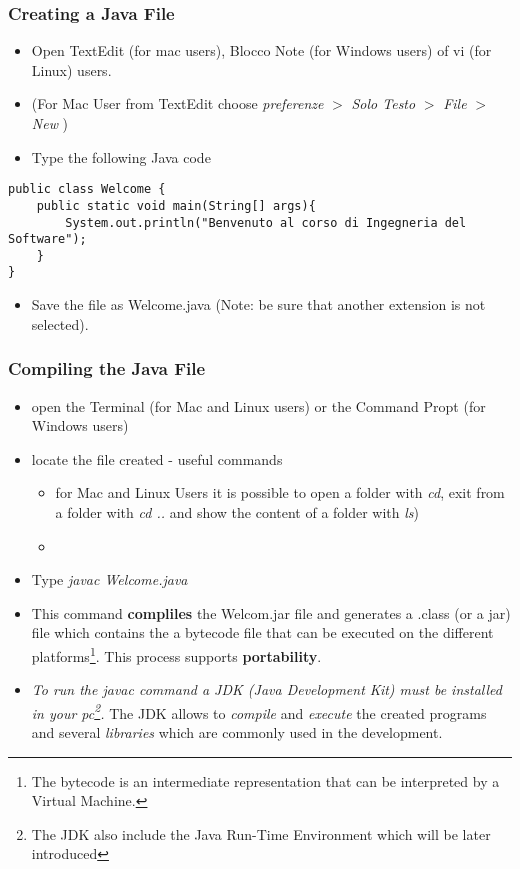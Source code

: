 \documentclass{article}
\theoremstyle{definition}
\begin{document}
\subsubsection{Creating a Java File}
\begin{itemize}
\item Open TextEdit (for mac users), Blocco Note (for Windows users) of vi (for Linux) users.
\item (For Mac User from TextEdit choose \textit{preferenze} $>$ \textit{Solo Testo} $>$ \textit{File} $>$ \textit{New} )
\item Type the following Java code
\end{itemize}
\begin{lstlisting}
public class Welcome {	
    public static void main(String[] args){	
	 	System.out.println("Benvenuto al corso di Ingegneria del Software");
    }
}
\end{lstlisting}
\begin{itemize}
\item Save the file as Welcome.java (Note: be sure that another extension is not selected).
\end{itemize}

\subsubsection{Compiling the Java File}
\begin{itemize}
\item open the Terminal (for Mac and Linux users) or the Command Propt (for Windows users)
\item locate the file created - useful commands 
\begin{itemize}
\item for Mac and Linux Users it is possible to open a folder with \emph{cd}, exit from a folder with \emph{cd ..} and show the content of a folder with \emph{ls}) 
\item
\end{itemize}
\item Type \emph{javac Welcome.java}
\item This command \textbf{compliles} the Welcom.jar file and generates a .class (or a jar) file which contains the a bytecode file that can be executed on the different platforms\footnote{The bytecode is an intermediate representation that can be interpreted by a Virtual Machine.}. This process supports \textbf{portability}.
\item \emph{To run the javac command a JDK (Java Development Kit) must be installed in your pc\footnote{The JDK also include the Java Run-Time Environment which will be later introduced}.} The JDK allows to \emph{compile} and \emph{execute} the created programs and several \emph{libraries} which are commonly used in the development.
\end{itemize}
\end{document}
